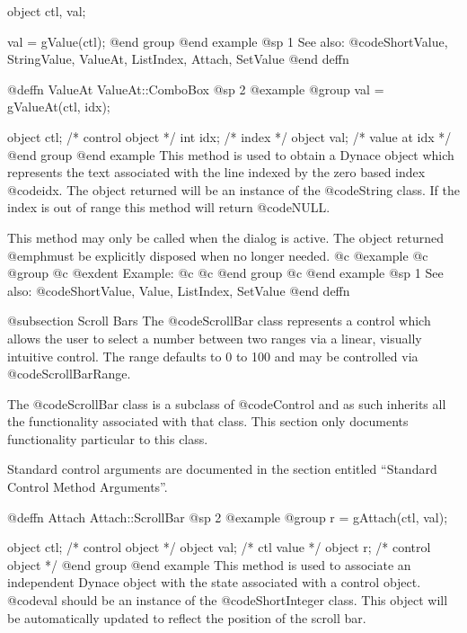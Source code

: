 {object  ctl, val;

val = gValue(ctl);
@end group
@end example
@sp 1
See also:  @code{ShortValue, StringValue, ValueAt, ListIndex, Attach, SetValue}
@end deffn






@deffn {ValueAt} ValueAt::ComboBox
@sp 2
@example
@group
val = gValueAt(ctl, idx);

object  ctl;   /*  control object  */
int     idx;   /*  index           */
object  val;   /*  value at idx    */
@end group
@end example
This method is used to obtain a Dynace object which represents the text
associated with the line indexed by the zero based index @code{idx}.
The object returned will be an instance of the @code{String} class.  If
the index is out of range this method will return @code{NULL}.

This method may only be called when the dialog is active.  The object
returned @emph{must} be explicitly disposed when no longer needed.
@c @example
@c @group
@c @exdent Example:
@c 
@c @end group
@c @end example
@sp 1
See also:  @code{ShortValue, Value, ListIndex, SetValue}
@end deffn









@subsection Scroll Bars
The @code{ScrollBar} class represents a control which allows the user to
select a number between two ranges via a linear, visually intuitive
control.  The range defaults to 0 to 100 and may be controlled via
@code{ScrollBarRange}.

The @code{ScrollBar} class is a subclass of @code{Control} and as such
inherits all the functionality associated with that class.  This section
only documents functionality particular to this class.

Standard control arguments are documented in the section entitled
``Standard Control Method Arguments''.










@deffn {Attach} Attach::ScrollBar
@sp 2
@example
@group
r = gAttach(ctl, val);

object  ctl;   /*  control object  */
object  val;   /*  ctl value       */
object  r;     /*  control object  */
@end group
@end example
This method is used to associate an independent Dynace object with the
state associated with a control object.  @code{val} should be an
instance of the @code{ShortInteger} class.  This object will be
automatically updated to reflect the position of the scroll bar.

}
